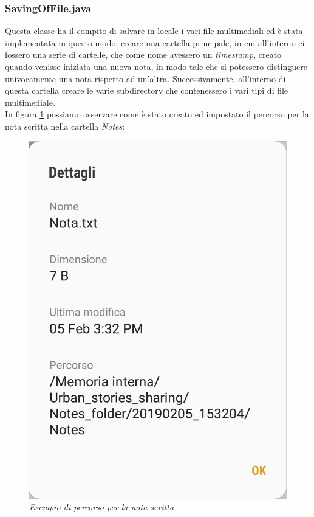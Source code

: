 \subsubsection{SavingOfFile.java}
Questa classe ha il compito di salvare in locale i vari file multimediali ed è stata implementata in questo modo: creare una cartella principale, in cui all'interno ci fossero una serie di cartelle, che come nome avessero un \textit{timestamp}, creato quando venisse iniziata una nuova nota, in modo tale che si potessero distinguere univocamente una nota rispetto ad un'altra. Successivamente, all'interno di questa cartella creare le varie subdirectory che contenessero i vari tipi di file multimediale.
\label{saving}
\\In figura \ref{percorso} possiamo osservare come è stato creato ed impostato il percorso per la nota scritta nella cartella \textit{Notes}:
\begin{figure}[!h]
    \centering
	\includegraphics[scale=0.20]{Tesi/images/Percorso.jpg}
	\caption{\textit{Esempio di percorso per la nota scritta}}
	\label{percorso}
\end{figure}


